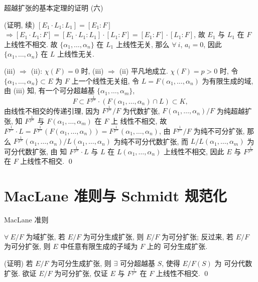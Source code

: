 
\begin{frame}{超越扩张的基本定理的证明 (六)}

\startproof[bg=yellow, fg=red](证明, 续)
$[E_1 \cdot L_1:L_1] = [E_1:F]$
$\Longrightarrow [E_1 \cdot L_1:F] = [E_1 \cdot L_1:L_1] \cdot [L_1:F]
= [E_1:F] \cdot [L_1:F]$,
故 $E_1$ 与 $L_1$ 在 $F$ 上线性不相交.
故 $\{ \alpha_1, \dots, \alpha_n \}$ 在 $L_1$ 上线性无关, 那么 $\forall\ i$,
$a_i = 0$,
因此 $\{ \alpha_1, \dots, \alpha_n \}$ 在 $L$ 上线性无关.

\pause

(iii) $\Longrightarrow$ (ii): $\chi(F) = 0$ 时, (iii) $\Longrightarrow$ (ii)
平凡地成立.
$\chi(F) = p > 0$ 时, 令 $\{ \alpha_1, \dots, \alpha_n \} \subset E$ 为 $F$
上一个线性无关组, 令 $L = F(\alpha_1, \dots, \alpha_n)$ 为有限生成的域,
由 (iii) 知, 有一个可分超越基 $\{ \alpha_1, \dots, \alpha_m \}$,
\[
F \subset F^{\frac{1}{p^{\infty}}} \cdot (F(\alpha_1, \dots, \alpha_n) \cap L)
\subset K,
\]
由线性不相交的传递引理, 因为 $F^{\frac{1}{p^{\infty}}}/F$ 为代数扩张,
$F(\alpha_1, \dots, \alpha_n)/F$ 为纯超越扩张,
知 $F^{\frac{1}{p^{\infty}}}$ 与 $F(\alpha_1, \dots, \alpha_m)$ 在 $F$ 上
线性不相交,
故 $F^{\frac{1}{p^{\infty}}} \cdot L = F^{\frac{1}{p^{\infty}}}
(F(\alpha_1, \dots, \alpha_n)) = F^{\frac{1}{p^{\infty}}}(\alpha_1, \dots, \alpha_n)$,
由 $F^{\frac{1}{p^{\infty}}}/F$ 为纯不可分扩张, 那么
$F^{\frac{1}{p^{\infty}}}(\alpha_1, \dots, \alpha_n)/L(\alpha_1, \dots, \alpha_n)$
为纯不可分代数扩张,
而 $L/L(\alpha_1, \dots, \alpha_m)$ 为可分代数扩张, 由  知
$F^{\frac{1}{p^{\infty}}} \cdot L$ 与 $L$ 在 $L(\alpha_1, \dots, \alpha_n)$
上线性不相交,
因此 $E$ 与 $F^{\frac{1}{p^{\infty}}}$ 在 $F$ 上线性不相交.
\qed

\end{frame}


\section[推论]{MacLane 准则与 Schmidt 规范化}


\begin{frame}{MacLane 准则}

\begin{cor}[MacLane 准则]
$\forall\ E/F$ 为域扩张, 若 $E/F$ 为可分生成扩张, 则 $E/F$ 为可分扩张;
反过来, 若 $E/F$ 为可分扩张, 则 $E$ 中任意有限生成的子域为 $F$ 上的
可分生成扩张.
\end{cor}

\startproof[bg=yellow, fg=red](证明)
若 $E/F$ 为可分生成扩张, 则 $\exists$ 可分超越基 $S$, 使得 $E/F(S)$ 为
可分代数扩张. 欲证 $E/F$ 为可分扩张, 仅证 $E$ 与 $F^{\frac{1}{p^{\infty}}}$
在 $F$ 上线性不相交.
\qed

\end{frame}

